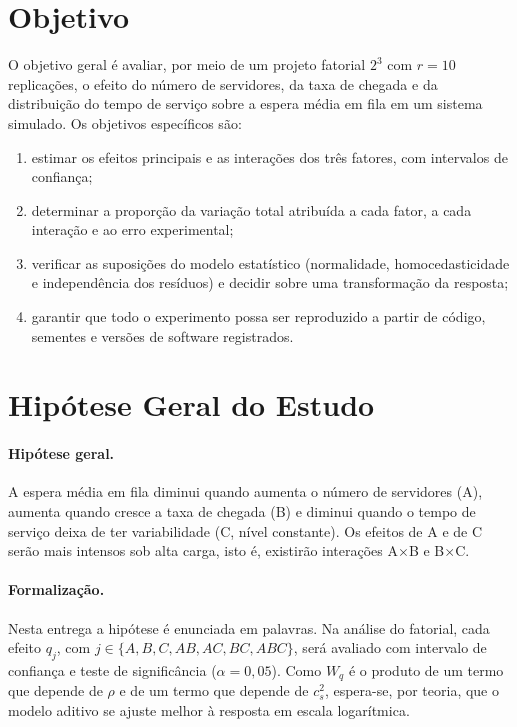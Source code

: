 \documentclass[stu,a4paper,12pt,floatsintext,biblatex]{apa7}
\newcommand{\Wq}{W_q}
\begin{document}
\section{Objetivo}
O objetivo geral é avaliar, por meio de um projeto fatorial $2^3$ com $r = 10$ replicações, o efeito do número de servidores, da taxa de chegada e da distribuição do tempo de serviço sobre a espera média em fila em um sistema simulado.
Os objetivos específicos são:
\begin{enumerate}[label=(\alph*),nosep]
  \item estimar os efeitos principais e as interações dos três fatores, com intervalos de confiança;
  \item determinar a proporção da variação total atribuída a cada fator, a cada interação e ao erro experimental;
  \item verificar as suposições do modelo estatístico (normalidade, homocedasticidade e independência dos resíduos) e decidir sobre uma transformação da resposta;
  \item garantir que todo o experimento possa ser reproduzido a partir de código, sementes e versões de software registrados.
\end{enumerate}

\section{Hipótese Geral do Estudo}
\label{sec:hipotese}

\paragraph{Hipótese geral.}
A espera média em fila diminui quando aumenta o número de servidores (A), aumenta quando cresce a taxa de chegada (B) e diminui quando o tempo de serviço deixa de ter variabilidade (C, nível constante).
Os efeitos de A e de C serão mais intensos sob alta carga, isto é, existirão interações A$\times$B e B$\times$C.


\paragraph{Formalização.}
Nesta entrega a hipótese é enunciada em palavras.
Na análise do fatorial, cada efeito $q_j$, com $j \in \{A, B, C, AB, AC, BC, ABC\}$, será avaliado com intervalo de confiança e teste de significância ($\alpha = 0{,}05$).
Como $\Wq$ é o produto de um termo que depende de $\rho$ e de um termo que depende de $c_s^2$, espera-se, por teoria, que o modelo aditivo se ajuste melhor à resposta em escala logarítmica.
\end{document}
